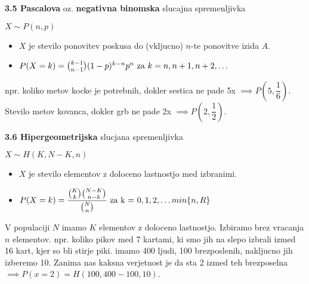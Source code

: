 \documentclass{article}
\begin{document}
\begin{multicols}{3}
	\textbf{3.5 Pascalova} oz. \textbf{negativna binomska} slucajna spremenljivka
	\begin{center}
		\begin{math}
			X \sim P(n, p)
		\end{math}
	\end{center}
	\begin{itemize}
		\item $X$ je stevilo ponovitev poskusa do (vkljucno) $n$-te ponovitve izida $A$.
		\item \begin{math}
			      P(X = k) = {k - 1 \choose n - 1 }(1 - p)^{k - n} p^{n} $ za $ k = n, n + 1, n + 2, \dots
		      \end{math}
	\end{itemize}
	npr. koliko metov kocke je potrebnih, dokler sestica ne pade 5x $\implies P(5, \dfrac{1}{6})$. Stevilo metov kovanca,
	dokler grb ne pade 2x $\implies P(2, \dfrac{1}{2})$.

	\textbf{3.6 Hipergeometrijska} slucjana spremenljivka
	\begin{center}
		\begin{math}
			X \sim H(K, N - K, n)
		\end{math}
	\end{center}
	\begin{itemize}
		\item $X$ je stevilo elementov z doloceno lastnostjo med izbranimi.
		\item \begin{math}
			      P(X = k) =  \dfrac{ {K \choose k} {N - K \choose n - k} }{{N \choose n}} $ za k = $ 0,1,2,\dots min\{ n, R \}
		      \end{math}
	\end{itemize}
	V populaciji $N$  imamo $K$ elementov  z doloceno lastnostjo. Izbiramo brez vracanja $n$ elementov.
	npr. koliko pikov med 7 kartami, ki smo jih na slepo izbrali izmed 16 kart, kjer so bli stirje piki.
	imamo 400 ljudi, 100 brezposlenih, nakljucno jih izberemo 10. Zanima nas kaksna verjetnost je da sta
	2 izmed teh brezposelna $\implies P(x=2) = H(100, 400-100, 10)$.


\end{multicols}
\end{document}
